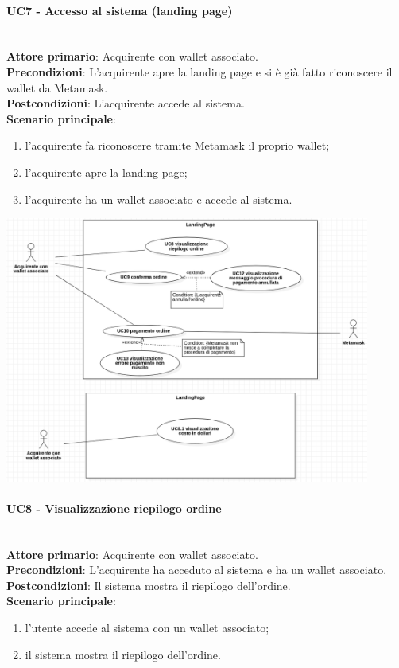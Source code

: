 \documentclass[a4paper, 12pt]{article}
\begin{document}
\paragraph{UC7 - Accesso al sistema (landing page)}\\
\textbf{Attore primario}: Acquirente con wallet associato.\\
\textbf{Precondizioni}: L'acquirente apre la landing page e si è già fatto riconoscere il wallet da Metamask.\\
\textbf{Postcondizioni}: L'acquirente accede al sistema.\\
\textbf{Scenario principale}:
\begin{enumerate}
    \item l'acquirente fa riconoscere tramite Metamask il proprio wallet;
    \item l'acquirente apre la landing page;
    \item l'acquirente ha un wallet associato e accede al sistema.
\end{enumerate}

\includegraphics[width=0.9\textwidth]{UseCase_landing_page3}

\paragraph{UC8 - Visualizzazione riepilogo ordine}\\
\textbf{Attore primario}: Acquirente con wallet associato.\\
\textbf{Precondizioni}: L'acquirente ha acceduto al sistema e ha un wallet associato.\\
\textbf{Postcondizioni}: Il sistema mostra il riepilogo dell'ordine.\\
\textbf{Scenario principale}:
\begin{enumerate}
    \item l’utente accede al sistema con un wallet associato;
    \item il sistema mostra il riepilogo dell'ordine.
\end{enumerate}
\end{document}
